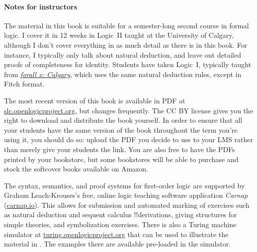 \paragraph{Notes for instructors} The material in this book is
suitable for a semester-long second course  in formal logic. I cover
it in 12 weeks in Logic~II taught at the University of Calgary,
although I don't cover everything in as much detail as there is in
this book. For instance, I typically only talk about natural
deduction, and leave out detailed proofs of completeness for identity.
Students have taken Logic~I, typically taught from
\emph{\href{https://forallx.openlogicproject.org}{forall x: Calgary}},
which uses the same natural deduction rules, except in Fitch format.

The most recent version of this book is available in PDF at
\href{https://slc.openlogicproject.org}{slc.openlogicproject.org}, but
changes frequently.  The CC BY license gives you the right to download
and distribute the book yourself. In order to ensure that all your
students have the same version of the book throughout the term you're
using it, you should do so: upload the PDF you decide to use to your
LMS rather than merely give your students the link. You are also free
to have the PDFs printed by your bookstore, but some bookstores will
be able to purchase and stock the softcover books available on Amazon.

The syntax, semantics, and proof systems for first-order logic are
supported by Graham Leach-Krouses's free, online logic teaching
software application \emph{Carnap}
(\href{https://carnap.io}{carnap.io}). This allows for submission and
automated marking of exercises such as natural deduction and sequent
calculus !!{derivation}s, giving structures for simple theories, and
symbolization exercises.  There is also a Turing machine simulator at
\href{https://turing.openlogicproject.org}{turing.openlogicproject.org}
that can be used to illustrate the material in .
The examples there are available pre-loaded in the simulator.